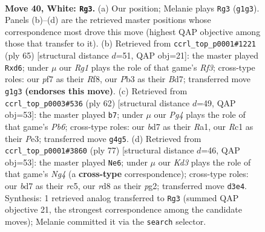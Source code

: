 \documentclass[11pt]{article}
\begin{document}
\clearpage

\begin{figure}[p]\centering
\begin{subfigure}{0.46\textwidth}\centering
\resizebox{\linewidth}{!}{%
\newchessgame
\chessboard[
  setfen={3r1k2/3b1p1p/1p4r1/p7/P2p2P1/1P1K1B1N/7P/2R3R1 w - - 0 40},
  showmover=false,
  pgfstyle=straightmove, color=movearrow, markmove={g1-g3}
]}
\caption{}
\end{subfigure}\hfill
\begin{subfigure}{0.46\textwidth}\centering
\resizebox{\linewidth}{!}{%
\newchessgame
\chessboard[
  setfen={5r1k/1p1b3p/p1nP1r2/2R5/P4p2/N1P4P/4B1P1/5R1K b - - 4 33},
  showmover=false,
  pgfstyle=straightmove, color=movearrow, markmove={f6-d6}
]}
\caption{}
\end{subfigure}
\\[4pt]
\begin{subfigure}{0.46\textwidth}\centering
\resizebox{\linewidth}{!}{%
\newchessgame
\chessboard[
  setfen={1r3k2/5p1p/rP4p1/3p4/p5PP/3KPP2/8/RR6 w - - 1 32},
  showmover=false,
  pgfstyle=straightmove, color=movearrow, markmove={b6-b7}
]}
\caption{}
\end{subfigure}\hfill
\begin{subfigure}{0.46\textwidth}\centering
\resizebox{\linewidth}{!}{%
\newchessgame
\chessboard[
  setfen={3rr1k1/7p/8/2R2pn1/Pp1P4/4pP2/6P1/B3R1K1 b - - 1 39},
  showmover=false,
  pgfstyle=straightmove, color=movearrow, markmove={g5-e6}
]}
\caption{}
\end{subfigure}
\caption{\textbf{Move 40, White: \texttt{Rg3}.} (a) Our position; Melanie plays \texttt{Rg3} (\texttt{g1g3}). Panels (b)--(d) are the retrieved master positions whose correspondence most drove this move (highest QAP objective among those that transfer to it). (b) Retrieved from \texttt{ccrl\_top\_p0001\#1221} (ply 65) [structural distance $d$=51, QAP obj=21]: the master played \texttt{Rxd6}; under $\mu$ our \emph{Rg1} plays the role of that game's \emph{Rf3}; cross-type roles: our \emph{p}f7 as their \emph{R}f8, our \emph{P}b3 as their \emph{B}d7; transferred move \texttt{g1g3} \textbf{(endorses this move)}. (c) Retrieved from \texttt{ccrl\_top\_p0003\#536} (ply 62) [structural distance $d$=49, QAP obj=53]: the master played \texttt{b7}; under $\mu$ our \emph{Pg4} plays the role of that game's \emph{Pb6}; cross-type roles: our \emph{b}d7 as their \emph{R}a1, our \emph{R}c1 as their \emph{P}e3; transferred move \texttt{g4g5}. (d) Retrieved from \texttt{ccrl\_top\_p0001\#3860} (ply 77) [structural distance $d$=46, QAP obj=53]: the master played \texttt{Ne6}; under $\mu$ our \emph{Kd3} plays the role of that game's \emph{Ng4} (a \textbf{cross-type} correspondence); cross-type roles: our \emph{b}d7 as their \emph{r}c5, our \emph{r}d8 as their \emph{p}g2; transferred move \texttt{d3e4}. Synthesis: 1 retrieved analog transferred to \texttt{Rg3} (summed QAP objective 21, the strongest correspondence among the candidate moves); Melanie committed it via the \texttt{search} selector.}
\label{fig:thought-m78}
\end{figure}
\end{document}
